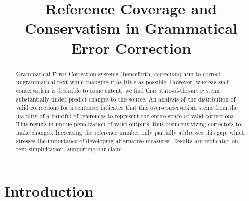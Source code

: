 \documentclass[letterpaper, 11pt]{article}
\newcommand{\lc}[1]{\footnote{\color{blue}LC: #1}}
\begin{document}
\title{Reference Coverage and Conservatism in Grammatical Error Correction}
\maketitle

\begin{abstract}
  Grammatical Error Correction systems (henceforth, {\it correctors}) aim to
  correct ungrammatical text while changing it as little as possible.
  However, whereas such conservatism is desirable to some extent,
  we find that state-of-the-art systems substantially under-predict
  changes to the source. 
  An analysis of the distribution of valid corrections for a sentence,   
  indicates that this over-conservatism stems from
  the inability of a handful of references to represent the entire space of valid
  corrections. This results in undue penalization of valid outputs,
  thus disincentivizing correctors to make changes.
  Increasing the reference number only partially addresses this gap,
  which stresses the importance of developing alternative measures.
  Results are replicated on text simplification, supporting our claim.
\end{abstract}

\section{Introduction}
\end{document}
